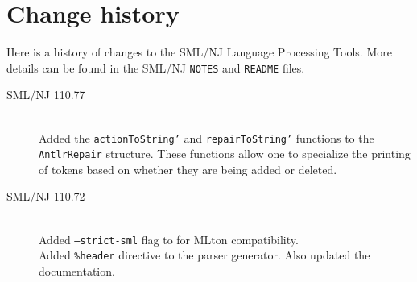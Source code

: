 %
\chapter{Change history}
\label{ch:history}

Here is a history of changes to the SML/NJ Language Processing Tools.
More details can be found in the SML/NJ \texttt{NOTES} and \texttt{README} files.
\begin{description}
  \item[SML/NJ 110.77] \mbox{}\\
    Added the \texttt{actionToString'} and \texttt{repairToString'} functions
    to the \texttt{AntlrRepair} structure.  These functions allow one to
    specialize the printing of tokens based on whether they are being added or deleted.
  \item[SML/NJ 110.72] \mbox{}\\
    Added \texttt{--strict-sml} flag to \ulex{} for MLton compatibility.\\[0.25em]
    Added \texttt{\%header} directive to the \mlantlr{} parser generator.  Also
    updated the documentation.
\end{description}%
